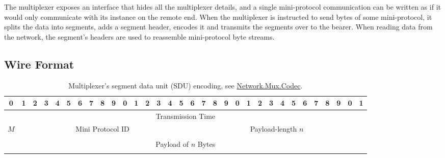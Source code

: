 The multiplexer exposes an interface that hides all the multiplexer details,
and a single mini-protocol communication can be written as if it would only
communicate with its instance on the remote end.  When the multiplexer is
instructed to send bytes of some mini-protocol, it splits the data into
segments, adds a segment header, encodes it and transmits the segments over to the
bearer.  When reading data from the network, the segment's headers are used
to reassemble mini-protocol byte streams.

\subsection{Wire Format}
\label{section:wire-format}

\begin{table}
  \begin{center}
    \begingroup
    \setlength{\tabcolsep}{3pt}
    \begin{tabular}{|c|c|c|c|c|c|c|c|c|c|c|c|c|c|c|c|c|c|c|c|c|c|c|c|c|c|c|c|c|c|c|c|}
      \hline
      0&1&2&3&4&5&6&7&8&9&0&1&2&3&4&5&6&7&8&9&0&1&2&3&4&5&6&7&8&9&0&1 \\ \hline
      \multicolumn{32}{|c|}{Transmission Time} \\ \hline
      \multicolumn{1}{|c|}{$M$}
      &\multicolumn{15}{|c|}{Mini Protocol ID}
      &\multicolumn{16}{|c|}{Payload-length $n$} \\ \hline
      \multicolumn{32}{|c|}{} \\
      \multicolumn{32}{|c|}{Payload of $n$ Bytes} \\
      \multicolumn{32}{|c|}{} \\ \hline
    \end{tabular}
    \endgroup
    \caption{Multiplexer's segment data unit (SDU) encoding, see
    \href{https://ouroboros-network.cardano.intersectmbo.org/network-mux/Network-Mux-Codec}{Network.Mux.Codec}.}
    \label{segment-header}
  \end{center}
\end{table}

